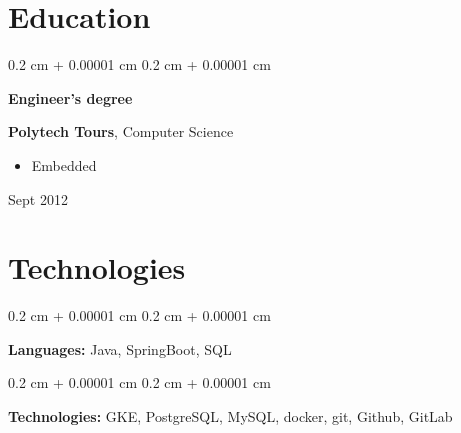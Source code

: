 \documentclass[10pt, letterpaper]{article}
\newenvironment{highlights}{
    \begin{itemize}[
        topsep=0.10 cm,
        parsep=0.10 cm,
        partopsep=0pt,
        itemsep=0pt,
        leftmargin=0.4 cm + 10pt
    ]
}{
    \end{itemize}
} %
\newenvironment{onecolentry}{
    \begin{adjustwidth}{
        0.2 cm + 0.00001 cm
    }{
        0.2 cm + 0.00001 cm
    }
}{
    \end{adjustwidth}
} %
\newenvironment{threecolentry}[3][]{
    \onecolentry
    \def\thirdColumn{#3}
    \setcolumnwidth{1 cm, \fill, 4.5 cm}
    \begin{paracol}{3}
    {\raggedright #2} \switchcolumn
}{
    \switchcolumn \raggedleft \thirdColumn
    \end{paracol}
    \endonecolentry
} %
\begin{document}
    
    \section{Education}



        
        \begin{threecolentry}{\textbf{Engineer's degree}}{
            Sept 2012
        }
            \textbf{Polytech Tours}, Computer Science
            \begin{highlights}
                \item Embedded
            \end{highlights}
        \end{threecolentry}


    
    \section{Technologies}



        
        \begin{onecolentry}
            \textbf{Languages:} Java, SpringBoot, SQL
        \end{onecolentry}

        \vspace{0.2 cm}

        \begin{onecolentry}
            \textbf{Technologies:} GKE, PostgreSQL, MySQL, docker, git, Github, GitLab
        \end{onecolentry}


    
\end{document}
